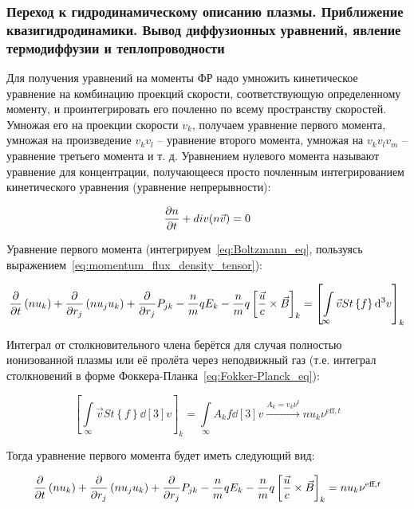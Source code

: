 \documentclass[10pt, a4paper]{article}
\begin{document}
\subsubsection{Переход к гидродинамическому описанию плазмы. Приближение квазигидродинамики. Вывод диффузионных уравнений, явление термодиффузии и теплопроводности} \label{subsubsec:hydrodynamic_description}

Для получения уравнений на моменты ФР надо умножить кинетическое уравнение на комбинацию проекций скорости, соответствующую определенному моменту, и проинтегрировать его почленно по всему пространству скоростей. Умножая его на проекции скорости $v_k$, получаем уравнение первого момента, умножая на произведение $v_kv_l$ -- уравнение второго момента, умножая на $v_kv_lv_m$ -- уравнение третьего момента и т. д. Уравнением нулевого момента называют уравнение для концентрации, получающееся просто почленным интегрированием кинетического уравнения (уравнение непрерывности):

\begin{equation} \label{eq:continuity_eq}
	\pdv{n}{t}+div{\left(n \vec{v} \right)} = 0
\end{equation}

Уравнение первого момента (интегрируем~\eqref{eq:Boltzmann_eq}, пользуясь выражением~\eqref{eq:momentum_flux_density_tensor}):

\begin{equation*}
	\pdv{}{t}\left(nu_k\right) +\pdv{}{r_j}\left( nu_ju_k\right) +\pdv{r_j}P_{jk}-\frac{n}{m}qE_k-\frac{n}{m}q\left[\frac{\vec{u}}{c}\times\vec{B}\right]_k=\left[\int\limits_\infty \vec{v} St\left\lbrace f\right\rbrace\dd[3]{v}\right]_k
\end{equation*}

Интеграл от столкновительного члена берётся для случая полностью ионизованной плазмы или её пролёта через неподвижный газ (т.е. интеграл столкновений в форме Фоккера-Планка~\eqref{eq:Fokker-Planck_eq}):

\begin{equation*}
	\left[\int\limits_\infty \vec{v} St\left\lbrace f\right\rbrace \dd[3]{v} \right]_k = \int\limits_\infty A_kf\dd[3]{v}\xrightarrow{A_k = v_k\nu^t}nu_k\nu^{\text{eff}, t}
\end{equation*}

Тогда уравнение первого момента будет иметь следующий вид:

\begin{equation*}
	\pdv{}{t}\left(nu_k\right) +\pdv{}{r_j}\left( nu_ju_k\right) +\pdv{r_j}P_{jk}-\frac{n}{m}qE_k-\frac{n}{m}q\left[\frac{\vec{u}}{c}\times\vec{B}\right]_k=nu_k\nu^{\text{eff}, t}
\end{equation*}
\end{document}
